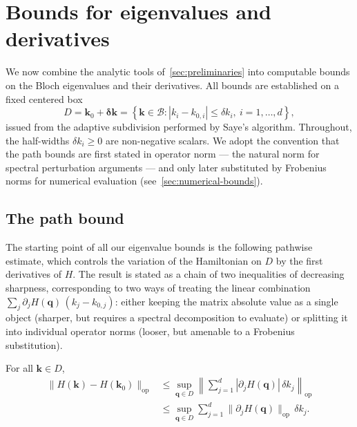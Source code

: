 \documentclass[11pt]{article}
\numberwithin{equation}{section}
\begin{document}
\section{Bounds for eigenvalues and derivatives}\label{sec:bounds}

We now combine the analytic tools of~\autoref{sec:preliminaries} into computable
bounds on the Bloch eigenvalues and their derivatives. All bounds are established
on a fixed centered box
\begin{equation}
    D = \mathbf{k}_0 + \bm{\delta\mathbf{k}}
    = \left\{ \mathbf{k} \in \mathcal{B} : |k_i - k_{0,i}| \leq \delta k_i,\
    i = 1, \dots, d \right\},
    \label{eq:box}
\end{equation}
issued from the adaptive subdivision performed by Saye's algorithm. Throughout,
the half-widths \(\delta k_i \geq 0\) are non-negative scalars. We adopt the
convention that the path bounds are first stated in operator norm — the natural
norm for spectral perturbation arguments — and only later substituted by
Frobenius norms for numerical evaluation (see~\autoref{sec:numerical-bounds}).

\subsection{The path bound}\label{sec:bounds-pathwise}

The starting point of all our eigenvalue bounds is the following pathwise estimate,
which controls the variation of the Hamiltonian on \(D\) by the first derivatives
of \(H\). The result is stated as a chain of two inequalities of decreasing
sharpness, corresponding to two ways of treating the linear combination
\(\sum_j \partial_j H(\mathbf{q})\,(k_j - k_{0,j})\): either keeping the matrix
absolute value as a single object (sharper, but requires a spectral decomposition
to evaluate) or splitting it into individual operator norms (looser, but
amenable to a Frobenius substitution).

\begin{lemma}\label{lemma:bounds}
    For all \(\mathbf{k} \in D\),
    \begin{align}
        \|H(\mathbf{k}) - H(\mathbf{k}_0)\|_\mathrm{op}
         & \leq \sup_{\mathbf{q}\in D}
        \left\| \sum_{j=1}^d |\partial_j H(\mathbf{q})|\, \delta k_j
        \right\|_\mathrm{op}
        \label{eq:pathwise-tight}       \\
         & \leq \sup_{\mathbf{q} \in D}
        \sum_{j=1}^d \|\partial_j H(\mathbf{q})\|_\mathrm{op}\, \delta k_j.
        \label{eq:pathwise-loose}
    \end{align}
\end{lemma}
\end{document}
